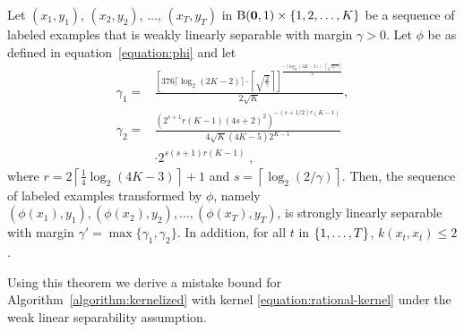 \begin{theorem}
\label{theorem:margin-transformation}
Let $(x_1, y_1)$, $(x_2, y_2)$, $\dots$, $(x_T, y_T)$ in $\operatorname{B}(\mathbf{0},1) \times
\{1,2,\dots,K\}$ be a sequence of labeled examples that is weakly linearly
separable with margin $\gamma > 0$. Let $\phi$ be as defined in
equation~\eqref{equation:phi} and let
\begingroup
\allowdisplaybreaks
\begin{align*}
\gamma_1 = & \frac{
  \left[
    376 \lceil \log_2(2K-2) \rceil \cdot \left \lceil \sqrt{\frac{2}{\gamma}} \right \rceil
  \right]^{
    \frac{-\lceil \log_2(2K-2) \rceil \cdot \left \lceil \sqrt{{2}/{\gamma}} \right \rceil}{2}
  }
}{2\sqrt{K}},
\\
\gamma_2 = & \frac{
   \left(2^{s+1} r(K-1) (4s+2)^2 \right)^{-(s+1/2)r(K-1)}
}{4\sqrt{K}(4K-5) 2^{K-1}}
\\
&  \cdot 2^{s(s+1)r(K-1)}
\; ,
\end{align*}
\endgroup
where $r = 2 \left\lceil \frac{1}{4} \log_2(4K-3) \right\rceil + 1$ and $s = \left \lceil \log_2(2/\gamma) \right \rceil$.
Then, the sequence of labeled examples transformed by $\phi$,
namely $(\phi(x_1), y_1), (\phi(x_2), y_2), \dots,
(\phi(x_T), y_T)$, is strongly linearly separable with margin $\gamma' =
\max\{\gamma_1, \gamma_2\}$. In addition, for all $t$ in $\cbr{1,\ldots,T}$,
$k(x_t,x_t) \leq 2$.
\end{theorem}

Using this theorem we derive a mistake bound for
Algorithm~\ref{algorithm:kernelized} with kernel \eqref{equation:rational-kernel}
under the weak linear separability assumption.

